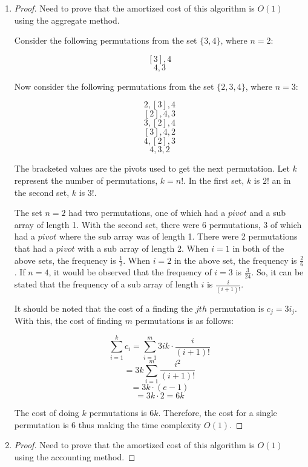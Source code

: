 \documentclass[11pt]{article}
\begin{document}
\begin{enumerate}
\item 

\begin{proof}
Need to prove that the amortized cost of this algorithm is $O(1)$ using the aggregate method.

Consider the following permutations from the set $\{ 3, 4 \}$, where $n = 2$:

$$
[3], 4
$$
$$
4, 3
$$

Now consider the following permutations from the set $\{ 2, 3, 4 \}$, where $n = 3$:

$$
2, [3], 4
$$
$$
[2], 4, 3
$$
$$
3, [2], 4
$$
$$
[3], 4, 2
$$
$$
4, [2], 3
$$
$$
4, 3, 2
$$

The bracketed values are the pivots used to get the next permutation. Let $k$ represent the number of permutations, $k = n!$. In the first set, $k$ is $2!$ an in the second set, $k$ is $3!$. 

The set $n = 2$ had two permutations, one of which had a $pivot$ and a sub array of length 1. With the second set, there were 6 permutations, 3 of which had a $pivot$ where the sub array was of length 1. There were 2 permutations that had a $pivot$ with a sub array of length 2. When $i = 1$ in both of the above sets, the frequency is $\frac{1}{2}$. When $i = 2$ in the above set, the frequency is $\frac{2}{6}$. If $n = 4$, it would be observed that the frequency of $i = 3$ is $\frac{3}{24}$. So, it can be stated that the frequency of a sub array of length $i$ is $\frac{i}{(i+1)!}$.

It should be noted that the cost of a finding the $jth$ permutation is $c_j = 3i_j$. With this, the cost of finding $m$ permutations is as follows:

$$
\sum_{i=1}^{k} c_i = \sum_{i=1}^{m} 3ik \cdot \frac{i}{(i+1)!}
$$
$$
 = 3k \sum_{i=1}^{m} \frac{i^2}{(i+1)!}
$$
$$
 = 3k \cdot (e-1)
$$
$$
 = 3k \cdot 2 = 6k
$$

The cost of doing $k$ permutations is $6k$. Therefore, the cost for a single permutation is 6 thus making the time complexity $O(1)$.


\end{proof}

\item

\begin{proof}
Need to prove that the amortized cost of this algorithm is $O(1)$ using the accounting method.


\end{proof}
\end{enumerate}
\end{document}
